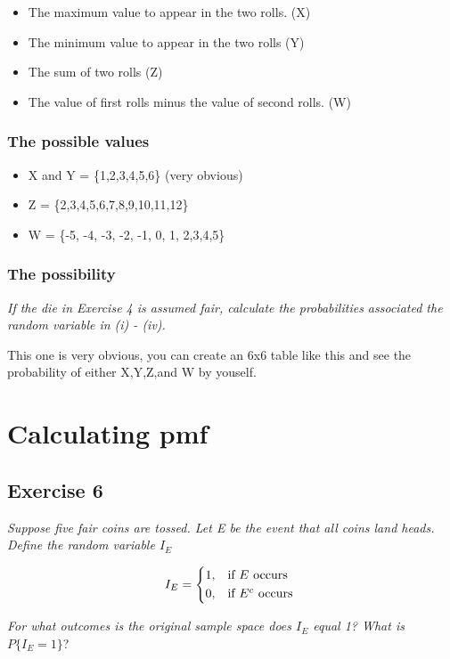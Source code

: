 \documentclass[12pt,a4paper]{article}
\begin{document}
\begin{itemize}
	\item The maximum value to appear in the two rolls. (X)
	\item The minimum value to appear in the two rolls (Y)
	\item The sum of two rolls (Z)
	\item The value of first rolls minus the  value of second rolls. (W)
\end{itemize}

\subsubsection{The possible values}

\begin{itemize}
	\item X and Y = \{1,2,3,4,5,6\} (very obvious)
	\item Z = \{2,3,4,5,6,7,8,9,10,11,12\}
	\item W = \{-5, -4, -3, -2, -1, 0, 1, 2,3,4,5\}
\end{itemize}

\subsubsection{The possibility}

\textit{If the die in Exercise 4 is assumed fair, calculate the probabilities associated the random variable in (i) - (iv).}

This one is very obvious, you can create an 6x6 table like this and see the probability of either X,Y,Z,and W by youself.

\section{Calculating pmf}
\subsection{Exercise 6}

\textit{Suppose five fair coins are tossed. Let E be the event that all coins land heads. Define the random variable $I_E$}

\[
I_E = \begin{dcases*}
1, & if $E$ occurs \\
0, & if $E^c$ occurs 
\end{dcases*}
\]

\textit{For what outcomes is the original sample space does $I_E$ equal 1? What is $P\{I_E = 1\}$}?
\end{document}
